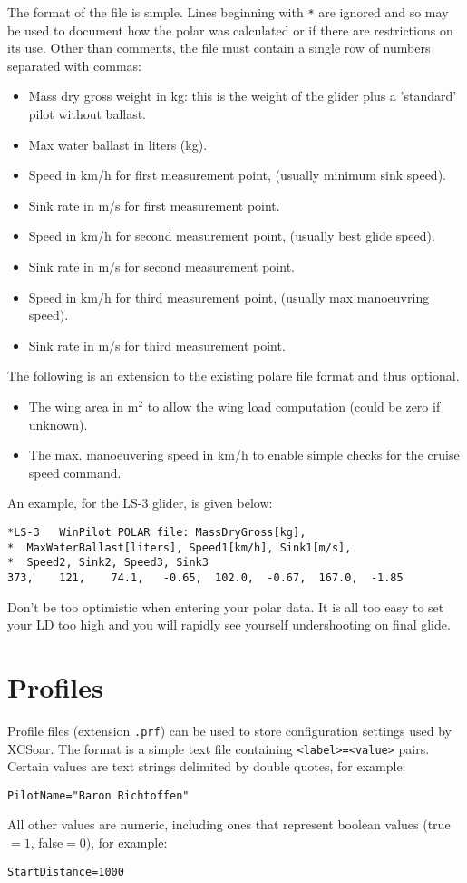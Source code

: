 The format of the file is simple.  Lines beginning with \verb|*| are
ignored and so may be used to document how the polar was calculated or
if there are restrictions on its use.  Other than comments, the file
must contain a single row of numbers separated with commas:
\begin{itemize}
\item Mass dry gross weight in kg: this is the weight of the glider plus
  a 'standard' pilot without ballast.
\item Max water ballast in liters (kg).
\item Speed in km/h for first measurement point, (usually minimum sink speed).
\item Sink rate in m/s for first measurement point.
\item Speed in km/h for second measurement point, (usually best glide speed).
\item Sink rate in m/s for second measurement point.
\item Speed in km/h for third measurement point, (usually max manoeuvring speed).
\item Sink rate in m/s for third measurement point.
\end{itemize}
The following is an extension to the existing polare file format and thus optional. 
\begin{itemize}
\item The wing area in m$^2$ to allow the wing load computation (could be zero if unknown). 
\item The max. manoeuvering speed in km/h to enable simple checks for the cruise speed command. 
\end{itemize}

An example, for the LS-3 glider, is given below:
\begin{verbatim}
*LS-3	WinPilot POLAR file: MassDryGross[kg], 
*  MaxWaterBallast[liters], Speed1[km/h], Sink1[m/s], 
*  Speed2, Sink2, Speed3, Sink3  	
373,	121,	74.1,	-0.65,	102.0,	-0.67,	167.0,	-1.85
\end{verbatim}

\tip Don't be too optimistic when entering your polar data. It is all too
easy to set your LD too high and you will rapidly see yourself
undershooting on final glide.

\section{Profiles}

Profile files (extension \verb|.prf|) can be used to store
configuration settings used by XCSoar.  The format is a simple text
file containing \verb|<label>=<value>| pairs.  Certain values are text
strings delimited by double quotes, for example:
\begin{verbatim}
PilotName="Baron Richtoffen"
\end{verbatim}
All other values are numeric, including ones that represent boolean
values (true$=1$, false$=0$), for example:
\begin{verbatim}
StartDistance=1000
\end{verbatim}

